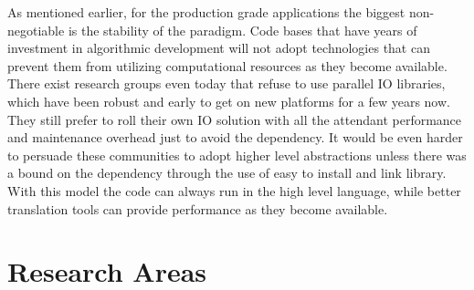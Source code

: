 As mentioned earlier, for the production grade applications the
biggest non-negotiable is the stability of the paradigm. Code bases
that have years of investment in algorithmic development will not
adopt technologies that can prevent them from utilizing computational
resources as they become available. There exist research groups even
today that refuse to use parallel IO libraries, which have been robust
and early to get on new platforms for a few years now. They still
prefer to roll their own IO solution with all the attendant
performance and maintenance overhead just to avoid the dependency. It
would be even harder to persuade these communities to adopt higher
level abstractions unless there was a bound on the dependency through
the use of easy to install and link library. With this model the code
can always run in the high level language, while better translation
tools can provide performance as they become available.




\section{Research Areas}

